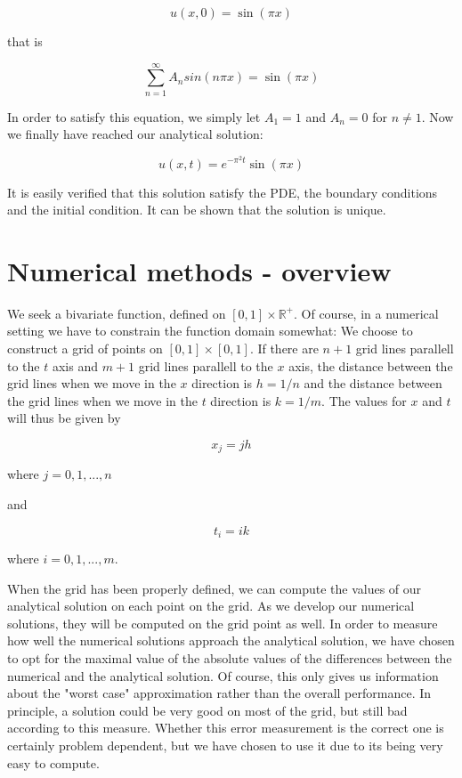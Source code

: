 \documentclass{article}
\begin{document}
\begin{equation}
    u(x, 0) = \sin(\pi x)
\end{equation}

that is

\begin{equation}
    \sum_{n=1}^{\infty}{A_n  sin(n \pi x)} = \sin(\pi x)
\end{equation}

In order to satisfy this equation, we simply let $A_1 = 1$ and $A_n = 0$ for $n \neq 1$. Now we finally have reached our analytical solution:

\begin{equation}
    u(x, t) = e^{-\pi^2 t} \sin(\pi x)
\end{equation}

It is easily verified that this solution satisfy the PDE, the boundary conditions and the initial condition. It can be shown that the solution is unique.

\section{Numerical methods - overview}
We seek a bivariate function, defined on $[0, 1] \times \mathbb{R}^+$. Of course, in a numerical setting we have to constrain the function domain somewhat: We choose to construct a grid of points on $[0, 1] \times [0, 1]$. If there are $n + 1$ grid lines parallell to the $t$ axis and $m + 1$ grid lines parallell to the $x$ axis, the distance between the grid lines when we move in the $x$ direction is $h = 1/n$ and the distance between the grid lines when we move in the $t$ direction is $k = 1/m$. The values for $x$ and $t$ will thus be given by

\begin{equation}
    x_j = jh
\end{equation}

where $j = 0, 1, ..., n$

and

\begin{equation}
    t_i = ik
\end{equation}

where $i = 0, 1, ..., m$.

When the grid has been properly defined, we can compute the values of our analytical solution on each point on the grid. As we develop our numerical solutions, they will be computed on the grid point as well. In order to measure how well the numerical solutions approach the analytical solution, we have chosen to opt for the maximal value of the absolute values of the differences between the numerical and the analytical solution. Of course, this only gives us information about the "worst case" approximation rather than the overall performance. In principle, a solution could be very good on most of the grid, but still bad according to this measure. Whether this error measurement is the correct one is certainly problem dependent, but we have chosen to use it due to its being very easy to compute.
\end{document}
